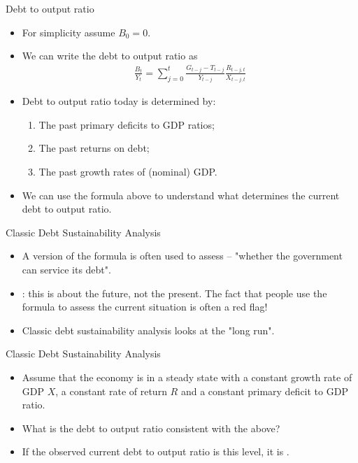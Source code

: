 \documentclass[11pt,xcolor={dvipsnames},aspectratio=159,hyperref={pdftex,pdfpagemode=UseNone,hidelinks,pdfdisplaydoctitle=true},usepdftitle=false]{beamer}
\begin{document}
\begin{frame}{Debt to output ratio}

    \begin{itemize}
        \item For simplicity assume $B_0=0$.
        \item We can write the debt to output ratio as 
        \begin{align*}
            \frac{B_{t}}{Y_t} = \sum_{j=0}^t \frac{G_{t-j}-T_{t-j}}{Y_{t-j}} \frac{R_{t-j,t}}{X_{t-j,t}}
        \end{align*}
        \item Debt to output ratio today is determined by: 
        \begin{enumerate}
            \item The past primary deficits to GDP ratios;
            \item The past returns on debt;
            \item The past growth rates of (nominal) GDP.
        \end{enumerate}
        \item We can use the formula above to understand what determines the current debt to output ratio. 
    \end{itemize}
\end{frame}

\begin{frame}{Classic Debt Sustainability Analysis}
    \begin{itemize}
        \item A version of the formula is often used to assess  -- "whether the government can service its debt".
        \item {}: this is about the future, not the present. The fact that people use the formula to assess the current situation is often a red flag!
        \item Classic debt sustainability analysis looks at the "long run".
        \end{itemize}
\end{frame}


\begin{frame}{Classic Debt Sustainability Analysis}
    \begin{itemize}
        \item Assume that the economy is in a steady state with a constant growth rate of GDP $X$, a constant rate of return $R$ and a constant primary deficit to GDP ratio.
        \item What is the debt to output ratio consistent with the above?
        \item If the observed current debt to output ratio is  this level, it is .
    \end{itemize}
\end{frame}
\end{document}
